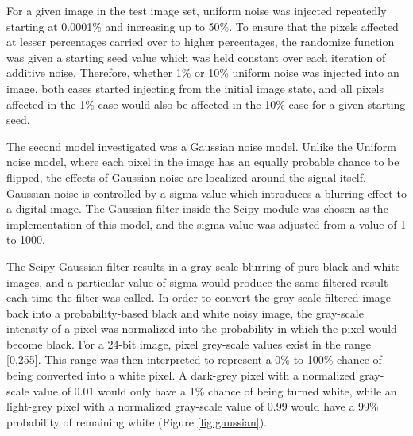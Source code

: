 \documentclass[12pt, oneside]{book}
\begin{document}
For a given image in the test image set, uniform noise was injected repeatedly starting at 0.0001\% and increasing up to 50\%.  To ensure that the pixels affected at lesser percentages carried over to higher percentages, the randomize function was given a starting seed value which was held constant over each iteration of additive noise.  Therefore, whether 1\% or 10\% uniform noise was injected into an image, both cases started injecting from the initial image state, and all pixels affected in the 1\% case would also be affected in the 10\% case for a given starting seed.

The second model investigated was a Gaussian noise model.  Unlike the Uniform noise model, where each pixel in the image has an equally probable chance to be flipped, the effects of Gaussian noise are localized around the signal itself.  Gaussian noise is controlled by a sigma value which introduces a blurring effect to a digital image.  The Gaussian filter inside the Scipy module was chosen as the implementation of this model, and the sigma value was adjusted from a value of 1 to 1000.

The Scipy Gaussian filter results in a gray-scale blurring of pure black and white images, and a particular value of sigma would produce the same filtered result each time the filter was called.  In order to convert the gray-scale filtered image back into a probability-based black and white noisy image, the gray-scale intensity of a pixel was normalized into the probability in which the pixel would become black. For a 24-bit image, pixel grey-scale values exist in the range [0,255].  This range was then interpreted to represent a 0\% to 100\% chance of being converted into a white pixel.  A dark-grey pixel with a normalized gray-scale value of 0.01 would only have a 1\% chance of being turned white, while an light-grey pixel with a normalized gray-scale value of 0.99 would have a 99\% probability of remaining white (Figure \ref{fig:gaussian}).
\end{document}
